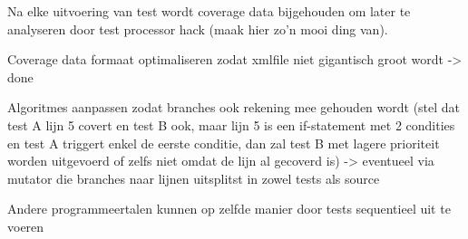 Na elke uitvoering van test wordt coverage data bijgehouden om later te analyseren door test processor hack (maak hier zo'n mooi ding van).

Coverage data formaat optimaliseren zodat xmlfile niet gigantisch groot wordt -> done

Algoritmes aanpassen zodat branches ook rekening mee gehouden wordt (stel dat test A lijn 5 covert en test B ook, maar lijn 5 is een if-statement met 2 condities en test A triggert enkel de eerste conditie, dan zal test B met lagere prioriteit worden uitgevoerd of zelfs niet omdat de lijn al gecoverd is) -> eventueel via mutator die branches naar lijnen uitsplitst in zowel tests als source

Andere programmeertalen kunnen op zelfde manier door tests sequentieel uit te voeren

